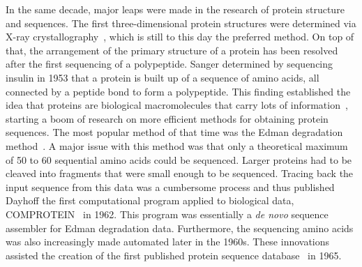 In the same decade, major leaps were made in the research of protein structure and sequences. The first three-dimensional protein structures were determined via X-ray crystallography~\cite{xray}, which is still to this day the preferred method. On top of that, the arrangement of the primary structure of a protein has been resolved after the first sequencing of a polypeptide. Sanger determined by sequencing ~\cite{insulin} insulin in 1953 that a protein is built up of a sequence of amino acids, all connected by a peptide bond to form a polypeptide. This finding established the idea that proteins are biological macromolecules that carry lots of information~\cite{primstruct}, starting a boom of research on more efficient methods for obtaining protein sequences. The most popular method of that time was the Edman degradation method~\cite{edman}. A major issue with this method was that only a theoretical maximum of 50 to 60 sequential amino acids could be sequenced. Larger proteins had to be cleaved into fragments that were small enough to be sequenced. Tracing back the input sequence from this data was a cumbersome process and thus published Dayhoff the first computational program applied to biological data, COMPROTEIN~\cite{comprotein} in 1962. This program was essentially a \textit{de novo} sequence assembler for Edman degradation data. Furthermore, the sequencing amino acids was also increasingly made automated later in the 1960s. These innovations assisted the creation of the first published protein sequence database~\cite{atlas} in 1965.

